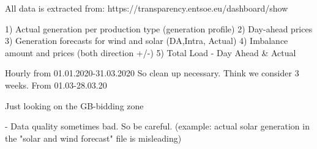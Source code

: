 

All data is extracted from: https://transparency.entsoe.eu/dashboard/show

1) Actual generation per production type (generation profile)
2) Day-ahead prices
3) Generation forecasts for wind and solar (DA,Intra, Actual)
4) Imbalance amount and prices (both direction +/-)
5) Total Load - Day Ahead & Actual

Hourly from 01.01.2020-31.03.2020
So clean up necessary. Think we consider 3 weeks. From 01.03-28.03.20

Just looking on the GB-bidding zone

- Data quality sometimes bad. So be careful. (example:  actual solar generation in the "solar and wind forecast" file is misleading) 